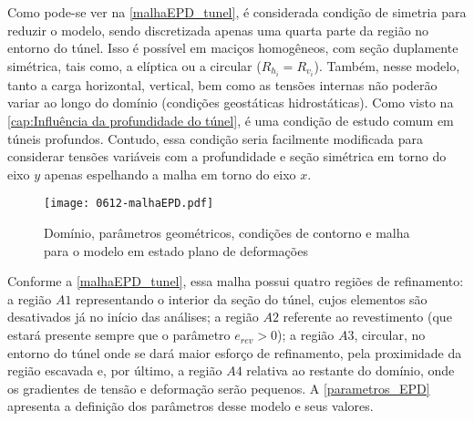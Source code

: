 Como pode-se ver na \autoref{malhaEPD_tunel}, é considerada condição de simetria para reduzir o modelo, sendo discretizada apenas uma quarta parte da região no entorno do túnel. Isso é possível em maciços homogêneos, com seção duplamente simétrica, tais como, a elíptica ou a circular ($R_{h_i}=R_{v_i}$). Também, nesse modelo, tanto a carga horizontal, vertical, bem como as tensões internas não poderão variar ao longo do domínio (condições geostáticas hidrostáticas). Como visto na \autoref{cap:Influência da profundidade do túnel}, é uma condição de estudo comum em túneis profundos. Contudo, essa condição seria facilmente modificada para considerar tensões variáveis com a profundidade e seção simétrica em torno do eixo $y$ apenas espelhando a malha em torno do eixo $x$.

\begin{figure}[H]
	\begin{center}
		\texttt{[image: 0612-malhaEPD.pdf]}
	\end{center}
	\caption{\label{malhaEPD_tunel}Domínio, parâmetros geométricos, condições de contorno e malha para o modelo em estado plano de deformações}
\end{figure}

Conforme a \autoref{malhaEPD_tunel}, essa malha possui quatro regiões de refinamento: a região $A1$ representando o interior da seção do túnel, cujos elementos são desativados já no início das análises; a região $A2$ referente ao revestimento (que estará presente sempre que o parâmetro  $e_{rev} > 0$); a região $A3$, circular, no entorno do túnel onde se dará maior esforço de refinamento, pela proximidade da região escavada e, por último, a região $A4$ relativa ao restante do domínio, onde os gradientes de tensão e deformação serão pequenos. A \autoref{parametros_EPD} apresenta a definição dos parâmetros desse modelo e seus valores.

